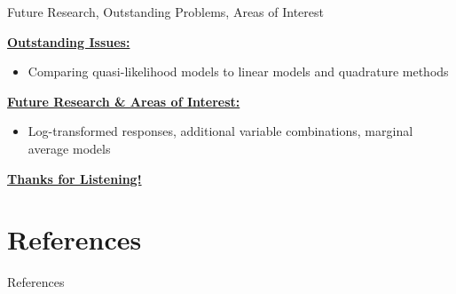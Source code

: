 \documentclass[11pt]{beamer}
\begin{document}
\begin{frame}{Future Research, Outstanding Problems, Areas of Interest}

\textbf{\underline{Outstanding Issues:}}
\begin{itemize}
	\item Comparing quasi-likelihood models to linear models and quadrature methods
\end{itemize}

\vspace{5pt}

\textbf{\underline{Future Research \& Areas of Interest:}}
\begin{itemize}
	\item Log-transformed responses, additional variable combinations, marginal average models
\end{itemize}

\vspace{15pt}

\begin{center}
\Large{\textbf{\underline{Thanks for Listening!}}}
\end{center}

\end{frame}



\section{References}

\begin{frame}[allowframebreaks]{References}


\end{frame}
\end{document}
